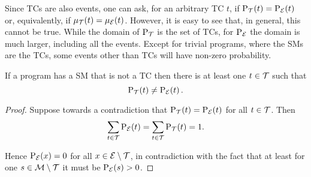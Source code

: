 \documentclass[x11names]{tlp}
\begin{document}
Since \aclp{TC} are also events, one can ask, for an arbitrary \acl{TC} $t$,
if $\prT\at{t} = \prE\at{t}$ or, equivalently, if $\pwt{t} = \pwe{t}$.
However, it is easy to see that, in general, this cannot be true. While the
domain of $\prT$ is the set of \aclp{TC}, for $\prE$ the domain is much
larger, including all the events. Except for trivial programs, where the
\acp{SM} are the \acp{TC}, some events other than \aclp{TC} will have
non-zero probability.
\begin{proposition} \label{prop:two.distributions} %

	If a program has a \acl{SM} that is not a \acl{TC} then there is at least one
	$t\in\TCHOICEset$ such that
	\begin{equation}
		\prT\at{t} \not= \prE\at{t}. \label{eq:two.distributions}
	\end{equation}

\end{proposition}
\begin{proof}
	Suppose towards a contradiction that $\prT\at{t} = \prE\at{t}$ for
	all $t \in \TCHOICEset$.  Then
	\begin{equation*}
		\sum_{t\in\TCHOICEset} \prE\at{t} = \sum_{t\in\TCHOICEset} \prT\at{t} = 1.
	\end{equation*}

	Hence $\prE\at{x} = 0$ for all $x \in \EVENTSset\setminus\TCHOICEset$, in
	contradiction with the fact that at least for one $s \in
		\MODELset\setminus\TCHOICEset$ it must be $\prE\at{s} > 0$.
\end{proof}
\end{document}
